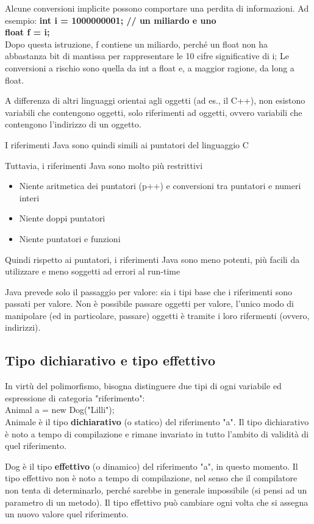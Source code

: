 \documentclass[10pt]{article}
\begin{document}
Alcune conversioni implicite possono comportare una perdita di informazioni.
Ad esempio: \textbf{int i = 1000000001; // un miliardo e uno \\ float f = i;}\\
Dopo questa istruzione, f contiene un miliardo, perché un float non ha abbastanza bit di mantissa per rappresentare le 10 cifre significative di i;
Le conversioni a rischio sono quella da int a float e, a maggior ragione, da long a float.

A differenza di altri linguaggi orientai agli oggetti (ad es., il C++), non esistono variabili che contengono oggetti, solo riferimenti ad oggetti, ovvero variabili che contengono l'indirizzo di un oggetto.

I riferimenti Java sono quindi simili ai puntatori del linguaggio C

Tuttavia, i riferimenti Java sono molto più restrittivi
\begin{itemize}
    \item Niente aritmetica dei puntatori (p++) e conversioni tra puntatori e numeri interi
    \item Niente doppi puntatori
    \item Niente puntatori e funzioni
\end{itemize}
Quindi rispetto ai puntatori, i riferimenti Java sono meno potenti, più facili da utilizzare e meno soggetti ad errori al run-time

Java prevede solo il passaggio per valore: sia i tipi base che i riferimenti sono passati per valore.
Non è possibile passare oggetti per valore, l'unico modo di manipolare (ed in particolare, passare) oggetti è tramite i loro rifermenti (ovvero, indirizzi).
\subsection{Tipo dichiarativo e tipo effettivo}
In virtù del polimorfismo, bisogna distinguere due tipi di ogni variabile ed espressione di categoria "riferimento":\\

Animal a = new Dog("Lilli");\\

Animale è il tipo \textbf{dichiarativo} (o statico) del riferimento "a".
Il tipo dichiarativo è noto a tempo di compilazione e rimane invariato in tutto l'ambito di validità di quel riferimento.

Dog è il tipo \textbf{effettivo} (o dinamico) del riferimento "a", in questo momento.
Il tipo effettivo non è noto a tempo di compilazione, nel senso che il compilatore non tenta di determinarlo, perché sarebbe in generale impossibile (si pensi ad un parametro di un metodo).
Il tipo effettivo può cambiare ogni volta che si assegna un nuovo valore quel riferimento.
\end{document}
